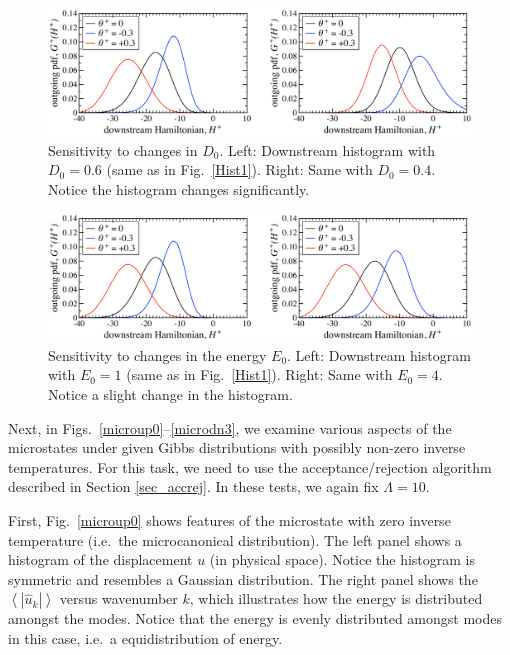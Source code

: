 \documentclass[12pt]{article}
\newcommand{\abs}[1]{\left| #1 \right|}
\newcommand{\mean}[1]{\left< #1 \right>}
\newcommand{\uhat}{\hat{u}}
\begin{document}
\begin{figure}[p]%
\begin{center}
\includegraphics[width = 0.8 \textwidth]{Hist2}
\caption{Sensitivity to changes in $D_0$.
Left: Downstream histogram with $D_0 = 0.6$ (same as in Fig.~\ref{Hist1}). Right: Same with $D_0 = 0.4$. Notice the histogram changes significantly.
}
\label{Hist2}
\end{center}
\end{figure}

\begin{figure}[p]%
\begin{center}
\includegraphics[width = 0.8 \textwidth]{Hist3}
\caption{Sensitivity to changes in the energy $E_0$.
Left: Downstream histogram with $E_0 = 1$ (same as in Fig.~\ref{Hist1}). Right: Same with $E_0 = 4$. Notice a slight change in the histogram.}
\label{Hist3}
\end{center}
\end{figure}
 
 Next, in Figs.~\ref{microup0}--\ref{microdn3}, we examine various aspects of the microstates under given Gibbs distributions with possibly non-zero inverse temperatures. For this task, we need to use the acceptance/rejection algorithm described in Section \ref{sec_accrej}. In these tests, we again fix $\Lambda = 10$.
 
 First, Fig.~\ref{microup0} shows features of the microstate with zero inverse temperature (i.e.~the microcanonical distribution). The left panel shows a histogram of the displacement $u$ (in physical space). Notice the histogram is symmetric and resembles a Gaussian distribution. The right panel shows the $\mean{\abs{\uhat_k}}$ versus wavenumber $k$, which illustrates how the energy is distributed amongst the modes. Notice that the energy is evenly distributed amongst modes in this case, i.e.~a equidistribution of energy.
 
\end{document}
